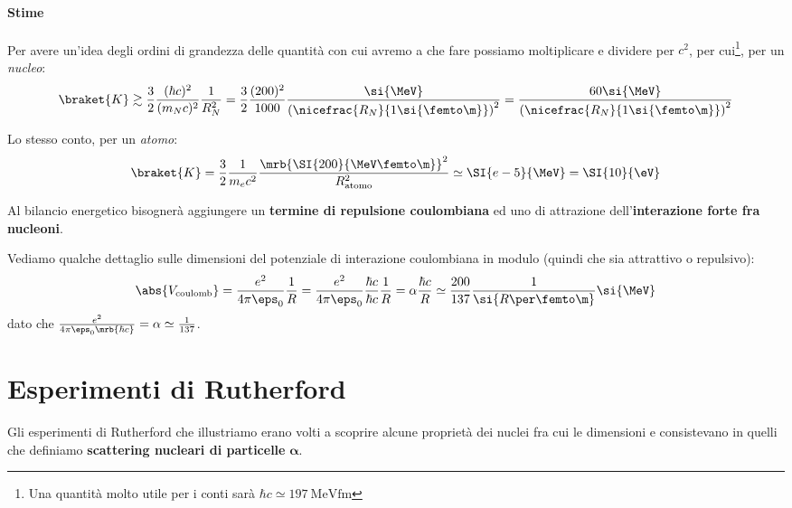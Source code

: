 \paragraph{Stime}
Per avere un'idea degli ordini di grandezza delle quantità con cui avremo a che
fare possiamo moltiplicare e
dividere per $c^2$, per cui\footnote{
	Una quantità molto utile per i conti sarà $\hbar c \simeq \SI{197}{\MeV
			\femto\m}$
}, per un \textit{nucleo}:
\begin{equation}
	\braket{K} \gtrsim \frac{3}{2}\frac{(\hbar c)^2}{(m_N c)^2}\frac{1}{R_N^2} =
	\frac{3}{2}\frac{(200)^2}{1000}
	\frac{\si{\MeV}}{\left(\nicefrac{R_N}{1\si{\femto\m}}\right)^2} =
	\frac{60\si{\MeV}} {\left(\nicefrac{R_N}{1\si{\femto\m}}\right)^2}
\end{equation}

Lo stesso conto, per un \textit{atomo}:
\begin{equation}
	\braket{K} = \frac{3}{2} \frac{1}{m_e c^2} \frac{\mrb{\SI{200}{\MeV
				\femto\m}}^{2}}{R_\text{atomo}^{2}} \simeq \SI{e-5}{\MeV} = \SI{10}{\eV}
\end{equation}

\begin{note}[]
	Al bilancio energetico bisognerà aggiungere un \textbf{termine di repulsione
		coulombiana} ed uno di attrazione dell'\textbf{interazione forte fra
		nucleoni}.
\end{note}

\begin{note}
	Vediamo qualche dettaglio sulle dimensioni del potenziale di interazione
	coulombiana in modulo (quindi che sia attrattivo o repulsivo):
	\begin{equation}
		\abs{V_\text{coulomb}} = \frac{e^2}{4 \pi \eps_0} \frac{1}{R} =
		\frac{e^2}{4 \pi \eps_0} \frac{\hbar c}{\hbar c} \frac{1}{R} = \alpha
		\frac{\hbar c}{R} \simeq \frac{200}{137} \frac{1}{\si{R \per \femto\m}}
		\si{\MeV}
	\end{equation}
	dato che $\frac{e^2}{4 \pi \eps_0 \mrb{\hbar c}} = \alpha \simeq
		\frac{1}{137}$.
\end{note}

\section{Esperimenti di Rutherford}
\label{sec:rutherford}
Gli esperimenti di Rutherford che illustriamo erano volti a scoprire alcune
proprietà dei nuclei fra cui le dimensioni e consistevano in quelli che
definiamo \textbf{scattering nucleari di particelle} $\boldsymbol{\alpha}$.

